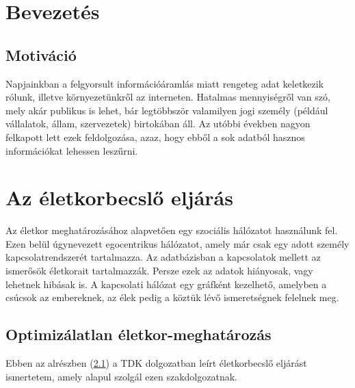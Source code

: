 \documentclass[12pt]{article}
\begin{document}
\section{Bevezetés}
\subsection{Motiváció}
Napjainkban a felgyorsult információáramlás miatt rengeteg adat keletkezik rólunk, illetve környezetünkről az interneten. %
Hatalmas mennyiségről van szó, mely akár publikus is lehet, bár legtöbbször valamilyen jogi személy (például vállalatok, állam, szervezetek) birtokában áll. Az utóbbi években nagyon felkapott lett ezek feldolgozása, azaz, hogy ebből a sok adatból hasznos információkat lehessen leszűrni.


\section{Az életkorbecslő eljárás} %
Az életkor meghatározásához alapvetően egy szociális hálózatot használunk fel. Ezen belül úgynevezett egocentrikus hálózatot, amely már csak egy adott személy kapcsolatrendszerét tartalmazza. Az adatbázisban a kapcsolatok mellett az ismerősök életkorait tartalmazzák. Persze ezek az adatok hiányosak, vagy lehetnek hibásak is. A kapcsolati hálózat egy gráfként kezelhető, amelyben a csúcsok az embereknek, az élek pedig a köztük lévő ismeretségnek felelnek meg.

\subsection{Optimizálatlan életkor-meghatározás} \label{eletkor_becsles_tamas_gabor}
Ebben az alrészben (\ref{eletkor_becsles_tamas_gabor}) a \cite{tamas_gabor_tdk} TDK dolgozatban leírt életkorbecslő eljárást ismertetem, amely alapul szolgál ezen szakdolgozatnak.
\end{document}
